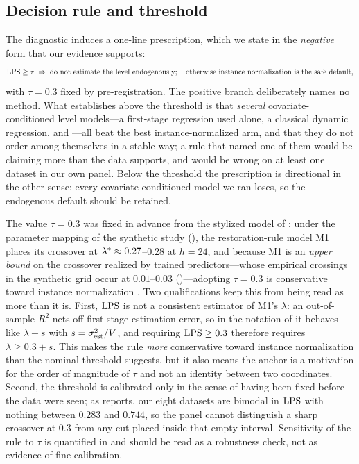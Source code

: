 \subsection{Decision rule and threshold}

The diagnostic induces a one-line prescription, which we state in the \emph{negative} form that our evidence supports:
\begin{equation*}
\mathrm{LPS} \geq \tau \;\Rightarrow\; \text{do not estimate the level endogenously};
\quad \text{otherwise instance normalization is the safe default},
\end{equation*}
with $\tau = 0.3$ fixed by pre-registration. The positive branch deliberately names no method. What  establishes above the threshold is that \emph{several} covariate-conditioned level models---a first-stage regression used alone, a classical dynamic regression, and \cnm---all beat the best instance-normalized arm, and that they do not order among themselves in a stable way; a rule that named one of them would be claiming more than the data supports, and would be wrong on at least one dataset in our own panel. Below the threshold the prescription is directional in the other sense: every covariate-conditioned model we ran loses, so the endogenous default should be retained.

The value $\tau = 0.3$ was fixed in advance from the stylized model of : under the parameter mapping of the synthetic study (), the restoration-rule model M1 places its crossover  at $\lambda^{*} \approx 0.27$--$0.28$ at $h=24$, and because M1 is an \emph{upper bound} on the crossover realized by trained predictors---whose empirical crossings in the synthetic grid occur at $0.01$--$0.03$ ()---adopting $\tau = 0.3$ is conservative toward instance normalization \citep{kim2022revin}. Two qualifications keep this from being read as more than it is. First, $\mathrm{LPS}$ is not a consistent estimator of M1's $\lambda$: an out-of-sample $R^2$ nets off first-stage estimation error, so in the notation of  it behaves like $\lambda - s$ with $s = \sigma_{\mathrm{est}}^2/V$, and requiring $\mathrm{LPS} \geq 0.3$ therefore requires $\lambda \geq 0.3 + s$. This makes the rule \emph{more} conservative toward instance normalization than the nominal threshold suggests, but it also means the anchor is a motivation for the order of magnitude of $\tau$ and not an identity between two coordinates. Second, the threshold is calibrated only in the sense of having been fixed before the data were seen; as  reports, our eight datasets are bimodal in $\mathrm{LPS}$ with nothing between $0.283$ and $0.744$, so the panel cannot distinguish a sharp crossover at $0.3$ from any cut placed inside that empty interval. Sensitivity of the rule to $\tau$ is quantified in  and should be read as a robustness check, not as evidence of fine calibration.

